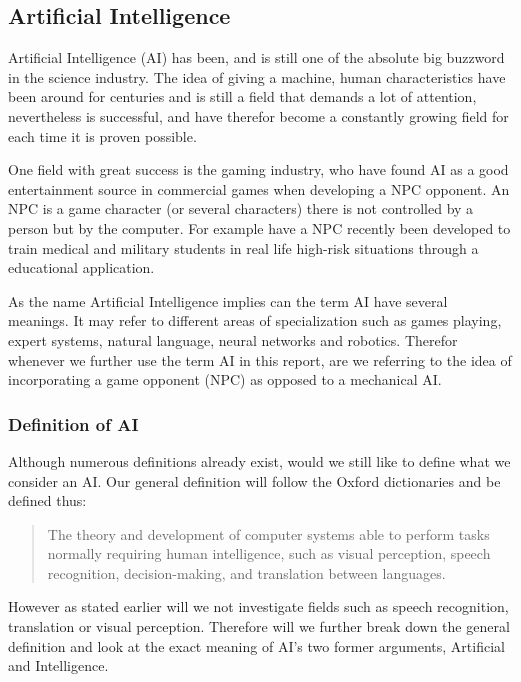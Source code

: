 

\subsection{Artificial Intelligence} \label{sec:ai}
Artificial Intelligence (AI) has been, and is still one of the absolute big buzzword in the science industry.
The idea of giving a machine, human characteristics have been around for centuries and is still a field that demands a lot of attention, \cite {Buchanan2006} nevertheless is successful, \cite {Franz2014} \cite {Varkey2014} and have therefor become a constantly growing field for each time it is proven possible. \cite {Kilde} 

One field with great success is the gaming industry, who have found AI as a good entertainment source in commercial games when developing a NPC opponent. \cite {kilde}  An NPC is a game character (or several characters) there is not controlled by a person but by the computer. \cite {Definition2014}  For example have a NPC recently been developed to train medical and military students in real life high-risk situations through a educational application. \cite {kilde} 

As the name Artificial Intelligence implies can the term AI have several meanings. It may refer to different areas of specialization such as games playing, expert systems, natural language, neural networks and robotics. \cite {Vangie2014} 
Therefor whenever we further use the term AI in this report, are we referring to the idea of incorporating a game opponent (NPC) as opposed to a mechanical AI.



\subsubsection{Definition of AI}

Although numerous definitions already exist, would we still like to define what we consider an AI. Our general definition will follow the Oxford dictionaries and be defined thus:

		\begin{quote}
		The theory and development of computer systems able to perform tasks normally requiring human 		intelligence, such as visual perception, speech recognition, decision-making, and translation between languages. \cite {Oxford2014} 
		\end{quote}

However as stated earlier will we not investigate fields such as speech recognition, translation or visual perception. Therefore will we further break down the general definition and look at the exact meaning of AI's two former arguments, Artificial and Intelligence.

